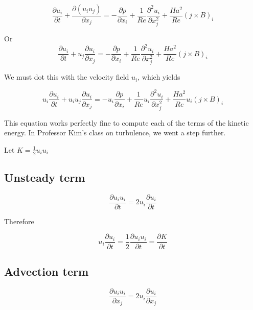 \documentclass[11pt]{article}
\begin{document}
\begin{equation}
	\frac{\partial u_i}{\partial t} + 
	\frac{\partial (u_i u_j)}{\partial x_j}
	= 
	- \frac{\partial p}{\partial x_i}
	+ \frac{1}{Re}
	\frac{\partial^2 u_i}{\partial x_j^2}
	+ \frac{Ha^2}{Re}
	(j \times B)_i
\end{equation}

Or
\begin{equation}
	\frac{\partial u_i}{\partial t} + 
	u_j\frac{\partial u_i}{\partial x_j}
	= 
	- \frac{\partial p}{\partial x_i}
	+ \frac{1}{Re}
	\frac{\partial^2 u_i}{\partial x_j^2}
	+ \frac{Ha^2}{Re}
	(j \times B)_i
\end{equation}


We must dot this with the velocity field $u_i$, which yields

\begin{equation}
	\boxed{
	u_i
	\frac{\partial u_i}{\partial t} + 
	u_i
	u_j\frac{\partial u_i}{\partial x_j}
	= 
	- u_i
	\frac{\partial p}{\partial x_i}
	+ \frac{1}{Re}
	u_i
	\frac{\partial^2 u_i}{\partial x_j^2}
	+ \frac{Ha^2}{Re}
	u_i
	(j \times B)_i
	}
\end{equation}

This equation works perfectly fine to compute each of the terms of the kinetic energy. In Professor Kim's class on turbulence, we went a step further.

Let $K = \frac{1}{2} u_i u_i$

\subsection{Unsteady term}
\begin{equation}
	\frac{\partial u_i u_i}{\partial t}
	=
	2 u_i \frac{\partial u_i}{\partial t}
\end{equation}

Therefore

\begin{equation}
	u_i \frac{\partial u_i}{\partial t}
	=
	\frac{1}{2} \frac{\partial u_i u_i}{\partial t}
	=
	\frac{\partial K}{\partial t}
\end{equation}

\subsection{Advection term}
\begin{equation}
	\frac{\partial u_i u_i}{\partial x_j}
	=
	2 u_i \frac{\partial u_i}{\partial x_j}
\end{equation}
\end{document}
